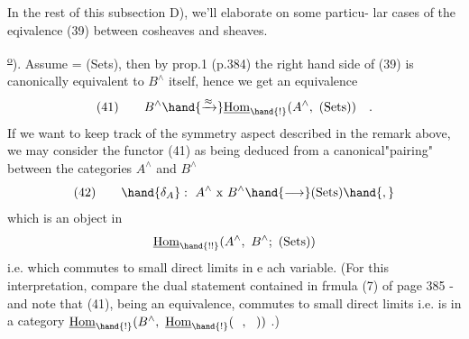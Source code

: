 In the rest of this subsection D), we'll elaborate on some particu-%
lar cases of the eqivalence (39) between cosheaves and sheaves.

\textsuperscript{\uline{o}}). Assume  = (Sets), then by prop.1 (p.384) the right hand
side of (39) is canonically equivalent to $B^{\wedge}$ itself, hence we get an
equivalence
\[ (41)\qquad B^{\wedge} \hand{\xrightarrow{\approx}} \underline{\mathrm{Hom}}_{\hand{!}}(A^{\wedge},\ (\mathrm{Sets})) \quad . \]
If we want to keep track of the symmetry aspect described in the remark
above, we may consider  the functor (41) as being deduced from a
canonical"pairing" between the categories $A^{\wedge}$ and $B^{\wedge}$
\[ (42)\qquad \hand{\delta_{A}}:\ A^{\wedge}\ \mathrm{x}\ B^{\wedge} \hand{\longrightarrow} (\mathrm{Sets}) \hand{,} \]
which is an object in
\[ \underline{\mathrm{Hom}}_{\hand{!!}}(A^{\wedge},\ B^{\wedge};\ (\mathrm{Sets})) \]
i.e. which commutes to small direct limits in e ach variable. (For this
interpretation, compare the dual statement contained in frmula (7) of
page 385 - and note that (41), being an equivalence, commutes to
small direct limits i.e. is in a category $\underline{\mathrm{Hom}}_{\hand{!}}(B^{\wedge},\ \underline{\mathrm{Hom}}_{\hand{!}}(\ \ ,\ \ ))$ .)

